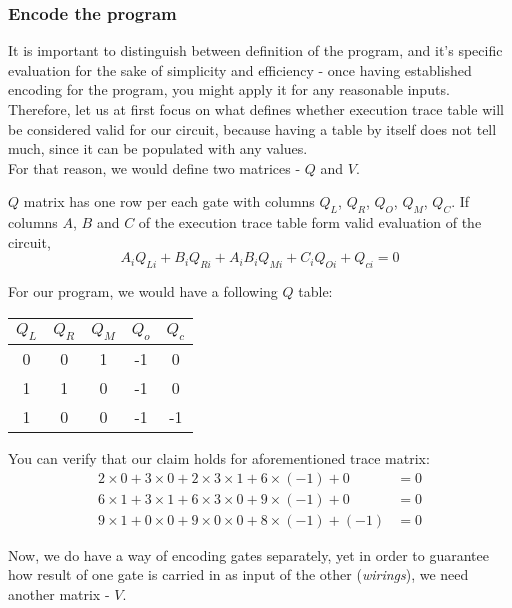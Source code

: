 \documentclass[../lecture-notes.tex]{subfiles}
\begin{document}
\subsubsection{Encode the program}

It is important to distinguish between definition of the program, and it's specific evaluation for the sake of simplicity and efficiency - once having established encoding for the program, you might apply it for any reasonable inputs.
Therefore, let us at first focus on what defines whether execution trace table will be considered valid for our circuit, because having a table by itself does not tell much, since it can be populated with any values. \\
For that reason, we would define two matrices - $Q$ and $V$.

\begin{definition}
$Q$ matrix has one row per each gate with columns $Q_L$, $Q_R$, $Q_O$, $Q_M$, $Q_C$. If columns $A$, $B$ and $C$ of the execution trace table form valid evaluation of the circuit, 
\[A_i Q_{Li} + B_i Q_{Ri} + A_i B_i Q_{Mi} + C_i Q_{Oi} + Q_{ci} = 0\]
\end{definition}

\begin{example}

For our program, we would have a following $Q$ table:
\begin{center}
\begin{tabular}{|c|c|c|c|c|}
\hline
$Q_L$ & $Q_R$ & $Q_M$ & $Q_o$ & $Q_c$ \\ 
\hline
0 & 0 & 1 & -1 & 0 \\ 
\hline
1 & 1 & 0 & -1 & 0 \\ 
\hline
1 & 0 & 0 & -1 & -1 \\ 
\hline
\end{tabular}
\end{center}

You can verify that our claim holds for aforementioned trace matrix:
\begin{align*}
  2 \times 0 + 3 \times 0 + 2 \times 3 \times 1 + 6 \times (-1) + 0 &= 0 \\
  6 \times 1 + 3 \times 1 + 6 \times 3 \times 0 + 9 \times (-1) + 0 &= 0 \\
  9 \times 1 + 0 \times 0 + 9 \times 0 \times 0 + 8 \times (-1) + (-1) &= 0 
\end{align*}
\end{example}

Now, we do have a way of encoding gates separately, yet in order to guarantee how result of one gate is carried in as input of the other (\textit{wirings}), we need another matrix - $V$.
\end{document}
